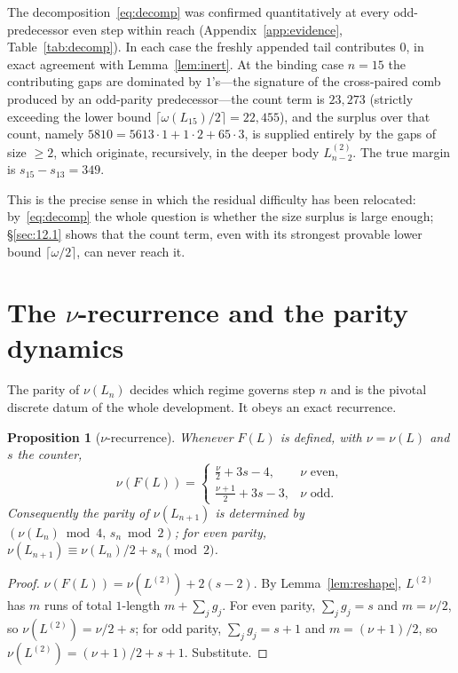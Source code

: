 \documentclass[11pt,reqno]{amsart}
\theoremstyle{plain}
\newtheorem{proposition}{Proposition}
\theoremstyle{definition}
\theoremstyle{remark}
\begin{document}
The decomposition~\eqref{eq:decomp} was confirmed quantitatively at every odd-predecessor even step within reach (Appendix~\ref{app:evidence}, Table~\ref{tab:decomp}). In each case the freshly appended tail contributes $0$, in exact agreement with Lemma~\ref{lem:inert}. At the binding case $n=15$ the contributing gaps are dominated by $1$'s---the signature of the cross-paired comb produced by an odd-parity predecessor---the count term is $23{,}273$ (strictly exceeding the lower bound $\lceil\omega(L_{15})/2\rceil=22{,}455$), and the surplus over that count, namely $5810=5613\cdot 1+ 1\cdot 2+ 65\cdot 3$, is supplied entirely by the gaps of size $\ge 2$, which originate, recursively, in the deeper body $L^{(2)}_{n-2}$. The true margin is $s_{15}-s_{13}=349$.

This is the precise sense in which the residual difficulty has been relocated: by~\eqref{eq:decomp} the whole question is whether the size surplus is large enough; \S\ref{sec:12.1} shows that the count term, even with its strongest provable lower bound $\lceil\omega/2\rceil$, can never reach it.

\section{The $\nu$-recurrence and the parity dynamics}\label{sec:nu}
The parity of $\nu(L_n)$ decides which regime governs step $n$ and is the pivotal discrete datum of the whole development. It obeys an exact recurrence.

\begin{proposition}[$\nu$-recurrence]\label{prop:nu}
Whenever $F(L)$ is defined, with $\nu=\nu(L)$ and $s$ the counter,
\[ \nu(F(L))=\begin{cases}\tfrac{\nu}{2}+3s-4,& \nu\text{ even},\\ \tfrac{\nu+1}{2}+3s-3,& \nu\text{ odd}.\end{cases} \]
Consequently the parity of $\nu(L_{n+1})$ is determined by $(\nu(L_n)\bmod 4,\,s_n\bmod 2)$; for even parity, $\nu(L_{n+1})\equiv\nu(L_n)/2+s_n\pmod 2$.
\end{proposition}
\begin{proof}
$\nu(F(L))=\nu(L^{(2)})+2(s-2)$. By Lemma~\ref{lem:reshape}, $L^{(2)}$ has $m$ runs of total $1$-length $m+\sum_j g_j$. For even parity, $\sum_j g_j=s$ and $m=\nu/2$, so $\nu(L^{(2)})=\nu/2+s$; for odd parity, $\sum_j g_j=s+1$ and $m=(\nu+1)/2$, so $\nu(L^{(2)})=(\nu+1)/2+s+1$. Substitute.
\end{proof}
\end{document}
